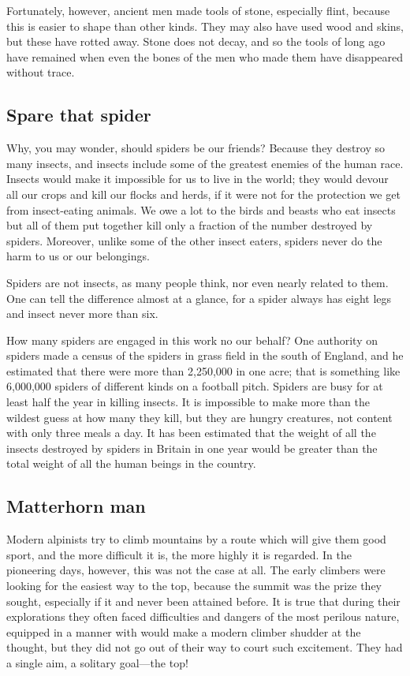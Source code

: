 \documentclass[11pt]{article}
\begin{document}
Fortunately, however, ancient men made tools of stone, especially flint, because this is easier to shape than other kinds. They may also have used wood and skins, but these have rotted away. Stone does not decay, and so the tools of long ago have remained when even the bones of the men who made them have disappeared without trace.
\subsection{Spare that spider}
\label{sec-2-2}

Why, you may wonder, should spiders be our friends? Because they destroy so many insects, and insects include some of the greatest enemies of the human race. Insects would make it impossible for us to live in the world; they would devour all our crops and kill our flocks and herds, if it were not for the protection we get from insect-eating animals. We owe a lot to the birds and beasts who eat insects but all of them put together kill only a fraction of the number destroyed by spiders. Moreover, unlike some of the other insect eaters, spiders never do the harm to us or our belongings.

Spiders are not insects, as many people think, nor even nearly related to them. One can tell the difference almost at a glance, for a spider always has eight legs and insect never more than six.

How many spiders are engaged in this work no our behalf? One authority on spiders made a census of the spiders in grass field in the south of England, and he estimated that there were more than 2,250,000 in one acre; that is something like 6,000,000 spiders of different kinds on a football pitch. Spiders are busy for at least half the year in killing insects. It is impossible to make more than the wildest guess at how many they kill, but they are hungry creatures, not content with only three meals a day. It has been estimated that the weight of all the insects destroyed by spiders in Britain in one year would be greater than the total weight of all the human beings in the country.
\subsection{Matterhorn man}
\label{sec-2-3}

Modern alpinists try to climb mountains by a route which will give them good sport, and the more difficult it is, the more highly it is regarded. In the pioneering days, however, this was not the case at all. The early climbers were looking for the easiest way to the top, because the summit was the prize they sought, especially if it and never been attained before. It is true that during their explorations they often faced difficulties and dangers of the most perilous nature, equipped in a manner with would make a modern climber shudder at the thought, but they did not go out of their way to court such excitement. They had a single aim, a solitary goal---the top!
\end{document}
